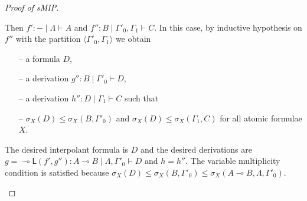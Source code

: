 \documentclass[sn-mathphys-num]{sn-jnl}%
\newcommand{\GG}{\Gamma}
\newcommand{\GL}{\Lambda}
\newcommand{\vd}{\vdash}
\newcommand{\lolli}{\multimap}
\newcommand{\lleft}{{\lolli}\mathsf{L}}
\newcommand{\gs}[1]{\sigma_{X} (#1)}
\newcommand{\sMIP}{\textsf{sMIP}}
\theoremstyle{thmstyleone}%
\theoremstyle{thmstyletwo}%
\theoremstyle{thmstylethree}%
\begin{document}
\begin{proof}[Proof of \sMIP]
\begin{itemize}
    Then $f' : {-} \mid \GL \vd A$ and $f'' : B \mid \GG'_0 , \GG_1 \vd C$.
    In this case, by inductive hypothesis on $f''$ with the partition $\langle \GG'_0 , \GG_1 \rangle$ we obtain
    \begin{itemize}
      \item[--]  a formula $D$,
      \item[--] a derivation $g'' : B \mid \GG'_0 \vd D$,
      \item[--] a derivation $h'' : D \mid \GG_1 \vd C$ such that 
      \item[--] $\gs{D} \leq \gs{B , \GG'_0} $ and $\gs{D} \leq \gs{\GG_1 , C}$ for all atomic formulae $X$.
    \end{itemize}
    The desired interpolant formula is $D$ and the desired derivations are $g = \lleft (f' , g'') : A \lolli B \mid \GL , \GG'_0 \vd D$ and $h = h''$.
    The variable multiplicity condition is satisfied because $\gs{D} \leq \gs{B , \GG'_0} \leq \gs{A \lolli B , \GL , \GG'_0}$.
    

\end{itemize}
\end{proof}
\end{document}
